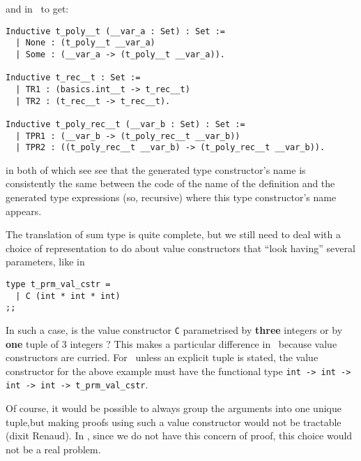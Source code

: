\noindent and in \coq\ to get:
{\footnotesize
\begin{lstlisting}[language=MyCoq, title=Sum type generated in \coq]
Inductive t_poly__t (__var_a : Set) : Set := 
  | None : (t_poly__t __var_a)
  | Some : (__var_a -> (t_poly__t __var_a)).

Inductive t_rec__t : Set := 
  | TR1 : (basics.int__t -> t_rec__t)
  | TR2 : (t_rec__t -> t_rec__t).

Inductive t_poly_rec__t (__var_b : Set) : Set := 
  | TPR1 : (__var_b -> (t_poly_rec__t __var_b))
  | TPR2 : ((t_poly_rec__t __var_b) -> (t_poly_rec__t __var_b)).
\end{lstlisting}
}
in both of which see see that the generated type constructor's name is
consistently the same between the code of the name of the definition
and the generated type expressions (so, recursive) where this type
constructor's name appears.

\medskip
\label{sum-value-cstr-tuple-versus-several-args}
The translation of sum type is quite complete, but we still need to
deal with a choice of representation to do about value
constructors that ``look having'' several parameters, like in
{\footnotesize
\begin{lstlisting}[title=Value constructor parameterised by
  ``several'' arguments]
type t_prm_val_cstr =
  | C (int * int * int)
;;
\end{lstlisting}
}
In such a case, is the value constructor {\tt C} parametrised by
{\bf three} integers or by {\bf one} tuple of 3 integers ? This makes
a particular difference in \coq\ because value constructors are
curried. For \coq\, unless an explicit tuple is stated, the value
constructor for the above example must have the functional type
{\tt int -> int -> int -> int -> t\_prm\_val\_cstr}.

Of course, it would be possible to always group the arguments into one
unique tuple,but making proofs using such a value constructor would
not be tractable (dixit Renaud). In \ocaml, since we do not have this
concern of proof, this choice would not be a real problem.

